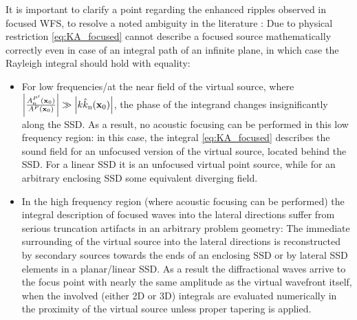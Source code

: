 \documentclass[lettersize,journal]{IEEEtran}
\begin{document}
It is important to clarify a point regarding the enhanced ripples observed in focused WFS, to resolve a noted ambiguity in the literature \cite{Wierstorf2013focused}: 
Due to physical restriction \eqref{eq:KA_focused} cannot describe a focused source mathematically correctly even in case of an integral path of an infinite plane, in which case the Rayleigh integral should hold with equality:
\begin{itemize}
\item For low frequencies/at the near field of the virtual source, where $\left|\frac{A^{P'}_{\mathrm{n}}(\mathbf{x}_0)}{A^P(\mathbf{x}_0)}\right|\gg \left|k \hat{k}_\mathrm{n}(\mathbf{x}_0) \right|$, the phase of the integrand changes insignificantly along the SSD.
As a result, no acoustic focusing can be performed in this low frequency region: in this case, the integral \eqref{eq:KA_focused} describes the sound field for an unfocused version of the virtual source, located behind the SSD.
For a linear SSD it is an unfocused virtual point source, while for an arbitrary enclosing SSD some equivalent diverging field.
\item In the high frequency region (where acoustic focusing can be performed) the integral description of focused waves into the lateral directions suffer from serious truncation artifacts in an arbitrary problem geometry: 
The immediate surrounding of the virtual source into the lateral directions is reconstructed by secondary sources towards the ends of an enclosing SSD or by lateral SSD elements in a planar/linear SSD.
As a result the diffractional waves arrive to the focus point with nearly the same amplitude as the virtual wavefront itself, when the involved (either 2D or 3D) integrals are evaluated numerically in the proximity of the virtual source unless proper tapering is applied.
\end{itemize}
\end{document}
